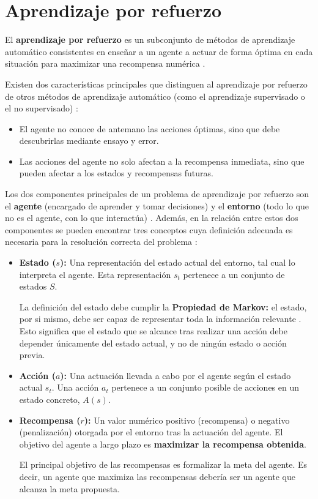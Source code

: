 \section{Aprendizaje por refuerzo}

El \textbf{aprendizaje por refuerzo} es un subconjunto de métodos de aprendizaje automático consistentes en enseñar a un agente a actuar de forma óptima en cada situación para maximizar una recompensa numérica \cite{Sutton1998}.

Existen dos características principales que distinguen al aprendizaje por refuerzo de otros métodos de aprendizaje automático (como el aprendizaje supervisado o el no supervisado) \cite{Sutton1998}:
\begin{itemize}
	\item El agente no conoce de antemano las acciones óptimas, sino que debe descubrirlas mediante ensayo y error.
	\item Las acciones del agente no solo afectan a la recompensa inmediata, sino que pueden afectar a los estados y recompensas futuras.
\end{itemize}

Los dos componentes principales de un problema de aprendizaje por refuerzo son el \textbf{agente} (encargado de aprender y tomar decisiones) y el \textbf{entorno} (todo lo que no es el agente, con lo que interactúa) \cite{Sutton1998}. Además, en la relación entre estos dos componentes se pueden encontrar tres conceptos cuya definición adecuada es necesaria para la resolución correcta del problema \cite{Sutton1998}:
\begin{itemize}
 \item \textbf{Estado ($s$):} Una representación del estado actual del entorno, tal cual lo interpreta el agente. Esta representación $s_t$ pertenece a un conjunto de estados $S$.
 
 La definición del estado debe cumplir la \textbf{Propiedad de Markov:} el estado, por si mismo, debe ser capaz de representar toda la información relevante \cite{Sutton1998}. Esto significa que el estado que se alcance tras realizar una acción debe depender únicamente del estado actual, y no de ningún estado o acción previa.
 \item \textbf{Acción ($a$):} Una actuación llevada a cabo por el agente según el estado actual $s_t$. Una acción $a_t$ pertenece a un conjunto posible de acciones en un estado concreto, $A(s)$.
 \item \textbf{Recompensa ($r$):} Un valor numérico positivo (recompensa) o negativo (penalización) otorgada por el entorno tras la actuación del agente. El objetivo del agente a largo plazo es \textbf{maximizar la recompensa obtenida}.
 
 El principal objetivo de las recompensas es formalizar la meta del agente. Es decir, un agente que maximiza las recompensas debería ser un agente que alcanza la meta propuesta.
\end{itemize}

